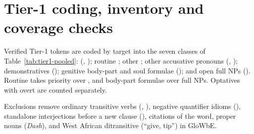 \documentclass[12pt]{article}
\begin{document}
\clearpage
\section{Tier-1 coding, inventory and coverage checks}\label{supp:tier1}

Verified Tier-1 tokens are coded by target into the seven classes of Table~\ref{tab:tier1-pooled}:  (, ); routine ; other ; other accusative pronouns (, ); demonstratives (); genitive body-part and soul formulae (); and open full NPs (). Routine  takes priority over , and body-part formulae over full NPs. Optatives with overt  are counted separately.

Exclusions remove ordinary transitive verbs (, ), negative quantifier idioms (), standalone interjections before a new clause (), citations of the word, proper nouns (\emph{Dash}), and West African ditransitive  (\enquote{give, tip}) in GloWbE.
\end{document}
